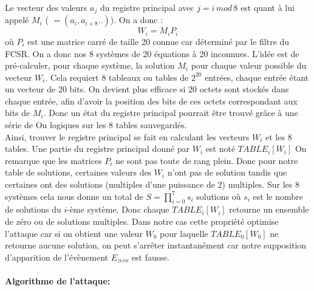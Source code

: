 \documentclass[11pt]{report}
\begin{document}
Le vecteur des valeurs $a_j$  du registre principal avec $j = i \, mod \, 8$ est quant à lui appelé $M_i$ ( $= (a_i,a_{i+8}..)$). On a donc : 
$$
W_i = M_iP_i
$$
où $P_i$ est une matrice carré de taille 20 connue car déterminé par le filtre du FCSR. 
On a donc nos 8 systèmes de 20 équations à 20 inconnues. 
L'idée est de pré-calculer, pour chaque système, la solution $M_i$ pour chaque valeur possible du vecteur $W_i$. Cela requiert 8 tableaux ou tables de $2^{20}$ entrées, chaque entrée étant un vecteur de 20 bits. On devient plus efficace si 20 octets sont stockés dans chaque entrée, afin d'avoir la position des bits de ces octets correspondant aux bits de $M_i$. Donc un état du registre principal pourrait être trouvé grâce à une série de Ou logiques sur les 8 tables sauvegardés. 
\\
Ainsi, trouver le registre principal se fait en calculant les vecteurs $W_i$ et les 8 tables. Une partie du registre principal donné par $W_i$ est noté $TABLE_i[W_i]$
On remarque que les matrices $P_i$ ne sont pas toute de rang plein. Donc pour notre table de solutions, certaines valeurs des $W_i$ n'ont pas de solution tandis que certaines ont des solutions (multiples d'une puissance de 2) multiples. Sur les 8 systèmes cela nous donne un total de $S=\prod_{i=0}^7 s_i$ solutions où $s_i$ est le nombre de solutions du $i$-ème système. Donc chaque $TABLE_i[W_i]$ retourne un ensemble de zéro ou de solutions multiples. Dans notre cas cette propriété optimise l'attaque car si on obtient une valeur $W_0$ pour laquelle $TABLE_0[W_0]$ ne retourne aucune solution, on peut s'arrêter instantanément car notre supposition d'apparition de l'évènement $E_{zero}$ est fausse. 
\\\\
\textbf{Algorithme de l'attaque:}
\\\\
\begin{algorithm}[H]
\end{algorithm}
\end{document}
